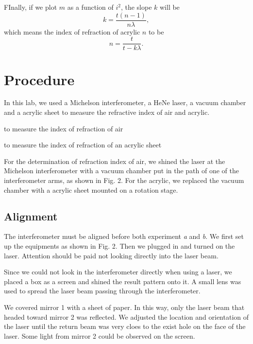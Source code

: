 \documentclass{article}
\begin{document}
FInally, if we plot $m$ as a function of $i^{2}$, the slope $k$ will be
\begin{equation}
	k=\dfrac{t(n-1)}{n\lambda},
\end{equation}
which means the index of refraction of acrylic $n$ to be 
\begin{equation}
	n=\dfrac{t}{t-k\lambda}.
\end{equation}

\section{Procedure}
In this lab, we used a Michelson interferometer, a HeNe laser, a vacuum chamber and a acrylic sheet to measure the refractive index of air and acrylic. 
\begin{enumerate}
	\begin{item}
	 to measure the index of refraction of air
	\end{item}
	\begin{item}
		to measure the index of refraction of an acrylic sheet
	\end{item}
\end{enumerate}

For the determination of refraction index of air, we shined the laser at the Michelson interferometer with a vacuum chamber put in the path of one of the interferometer arms, as shown in Fig. 2. For the acrylic, we replaced the vacuum chamber with a acrylic sheet mounted on a rotation stage. 
\subsection{Alignment}
The interferometer must be aligned before both experiment \textit{a} and \textit{b}. We first set up the equipments as shown in Fig. 2. Then we plugged in and turned on the laser. Attention should be paid not looking directly into the laser beam. 

Since we could not look in the interferometer directly when using a laser, we placed a box as a screen and shined the result pattern onto it. A small lens was used to spread the laser beam passing through the interferometer. 

We covered mirror 1 with a sheet of paper. In this way, only the laser beam that headed toward mirror 2 was reflected. We adjusted the location and orientation of the laser until the return beam was very cloes to the exist hole on the face of the laser. Some light from mirror 2 could be observed on the screen. 
\end{document}
